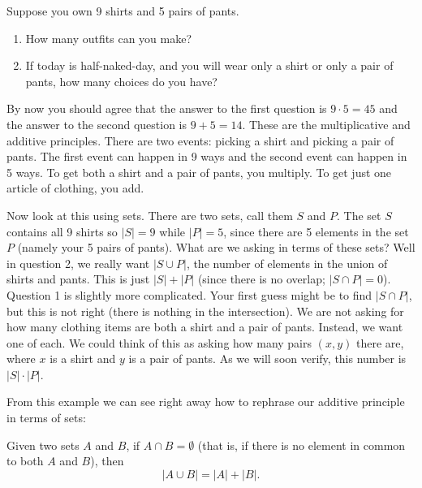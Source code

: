 \documentclass[11pt,]{book}
\theoremstyle{ptxplainnotitle}
\theoremstyle{ptxplaintitle}
\theoremstyle{ptxdefinitionnotitle}
\theoremstyle{ptxdefinitiontitle}
\theoremstyle{ptxdefinitionnotitle}
\theoremstyle{ptxdefinitiontitle}
\theoremstyle{ptxdefinitionnotitle}
\theoremstyle{ptxdefinitiontitle}
\theoremstyle{ptxdefinitiontitlenonumber}
\theoremstyle{ptxdefinitiontitlenonumber}
\numberwithin{equation}{chapter}
\newcommand{\card}[1]{\left| #1 \right|}
\begin{document}
\begin{example}\label{example-39}
\hypertarget{p-1015}{}%
Suppose you own 9 shirts and 5 pairs of pants.%
\par
\hypertarget{p-1016}{}%
\leavevmode%
\begin{enumerate}
\item\hypertarget{li-452}{}\hypertarget{p-1017}{}%
How many outfits can you make?%
\item\hypertarget{li-453}{}\hypertarget{p-1018}{}%
If today is half-naked-day, and you will wear only a shirt or only a pair of pants, how many choices do you have?%
\end{enumerate}
%
\par\smallskip%
\noindent\textbf{}\hypertarget{solution-141}{}\hypertarget{p-1019}{}%
By now you should agree that the answer to the first question is \(9 \cdot 5 = 45\) and the answer to the second question is \(9 + 5 = 14\). These are the multiplicative and additive principles. There are two events: picking a shirt and picking a pair of pants. The first event can happen in 9 ways and the second event can happen in 5 ways. To get both a shirt and a pair of pants, you multiply. To get just one article of clothing, you add.%
\par
\hypertarget{p-1020}{}%
Now look at this using sets. There are two sets, call them \(S\) and \(P\). The set \(S\) contains all 9 shirts so \(|S| = 9\) while \(|P| = 5\), since there are 5 elements in the set \(P\) (namely your 5 pairs of pants). What are we asking in terms of these sets? Well in question 2, we really want \(|S \cup P|\), the number of elements in the union of shirts and pants. This is just \(|S| + |P|\) (since there is no overlap; \(|S \cap P| = 0\)). Question 1 is slightly more complicated. Your first guess might be to find \(|S \cap P|\), but this is not right (there is nothing in the intersection). We are not asking for how many clothing items are both a shirt and a pair of pants. Instead, we want one of each. We could think of this as asking how many pairs \((x,y)\) there are, where \(x\) is a shirt and \(y\) is a pair of pants. As we will soon verify, this number is \(|S| \cdot |P|\).%
\end{example}
\hypertarget{p-1021}{}%
From this example we can see right away how to rephrase our additive principle in terms of sets:%
\begin{assemblage}\label{assemblage-13}
\hypertarget{p-1022}{}%
 Given two sets \(A\) and \(B\), if \(A \cap B = \emptyset\) (that is, if there is no element in common to both \(A\) and \(B\)), then%
\begin{equation*}
\card{A \cup B} = \card{A} + \card{B}.
\end{equation*}
%
\end{assemblage}
\end{document}
